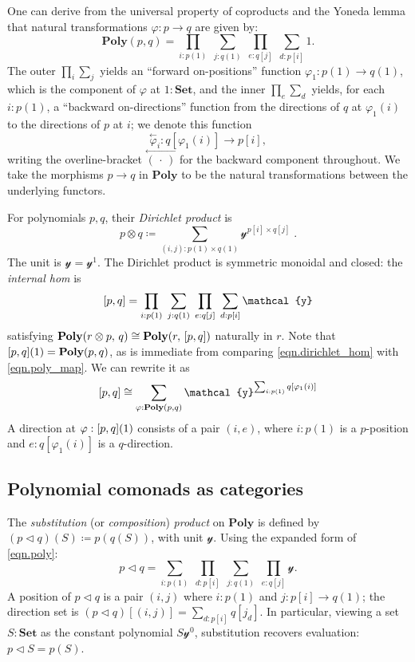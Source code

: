 \documentclass[11pt, oneside, article]{memoir}
\theoremstyle{definition}
\theoremstyle{plain}
\DeclarePairedDelimiter{\ihom}{[}{]}
\newcommand{\Cat}[1]{\mathbf{#1}}%
\newcommand{\bk}[1]{\overset{\scriptscriptstyle\leftarrow}{#1}}
\newcommand{\smset}{\Cat{Set}}
\newcommand{\yon}{\mathcal{y}}
\newcommand{\poly}{\Cat{Poly}}
\newcommand{\tri}{\mathbin{\triangleleft}}
\begin{document}
One can derive from the universal property of coproducts and the Yoneda lemma that natural transformations $\varphi\colon p\to q$ are given by:
\begin{equation}\label{eqn.poly_map}
\poly(p,q)=\prod_{i: p(1)}\;\sum_{j: q(1)}\;\prod_{e: q[j]}\; \sum_{d: p[i]}1.
\end{equation}
The outer $\prod_i\sum_j$ yields an ``forward on-positions'' function $\varphi_1\colon p(1)\to q(1)$, which is the component of $\varphi$ at $1:\smset$, and the inner $\prod_e\sum_d$ yields, for each $i:p(1)$, a ``backward on-directions'' function from the directions of $q$ at $\varphi_1(i)$ to the directions of $p$ at $i$; we denote this function
\[\bk{\varphi}_i\colon q[\varphi_1(i)]\to p[i],\]
writing the overline-bracket $\bk{(\,\cdot\,)}$ for the backward component throughout. We take the morphisms $p\to q$ in $\poly$ to be the natural transformations between the underlying functors.

For polynomials $p,q$, their \emph{Dirichlet product} is
\begin{equation}\label{eqn.dirichlet}
p\otimes q\coloneqq\sum_{(i,j):p(1)\times q(1)}\yon^{p[i]\times q[j]}\;.
\end{equation}
The unit is $\yon=\yon^1$. The Dirichlet product is symmetric monoidal and closed: the \emph{internal hom} is
\begin{equation}\label{eqn.dirichlet_hom}
\ihom{p,q}=\prod_{i: p(1)}\;\sum_{j: q(1)}\;\prod_{e: q[j]}\;\sum_{d: p[i]}\yon
\end{equation}
satisfying $\poly(r\otimes p,\, q)\cong\poly(r,\,\ihom{p,q})$ naturally in $r$. Note that $\ihom{p,q}(1)=\poly(p,q)$, as is immediate from comparing \eqref{eqn.dirichlet_hom} with \eqref{eqn.poly_map}. We can rewrite it as
\[
\ihom{p,q}\cong\sum_{\varphi: \poly(p,q)}\yon^{\sum_{i: p(1)}q[\varphi_1(i)]}
\]
A direction at $\varphi:\ihom{p,q}(1)$ consists of a pair $(i,e)$, where $i:p(1)$ is a $p$-position and $e:q[\varphi_1(i)]$ is a $q$-direction.

\subsection{Polynomial comonads as categories}\label{sec.comonads}

The \emph{substitution} (or \emph{composition}) \emph{product} on $\poly$ is defined by $(p\tri q)(S)\coloneqq p(q(S))$, with unit $\yon$. Using the expanded form of \eqref{eqn.poly}:
\begin{equation}\label{eqn.substitution}
p\tri q=\sum_{i: p(1)}\;\prod_{d: p[i]}\;\sum_{j: q(1)}\;\prod_{e: q[j]}\yon.
\end{equation}
A position of $p\tri q$ is a pair $(i,j)$ where $i: p(1)$ and $j\colon p[i]\to q(1)$; the direction set is $(p\tri q)[(i,j)]=\sum_{d:p[i]}q[j_d]$. In particular, viewing a set $S:\smset$ as the constant polynomial $S\yon^0$, substitution recovers evaluation: $p\tri S=p(S)$.
\end{document}
